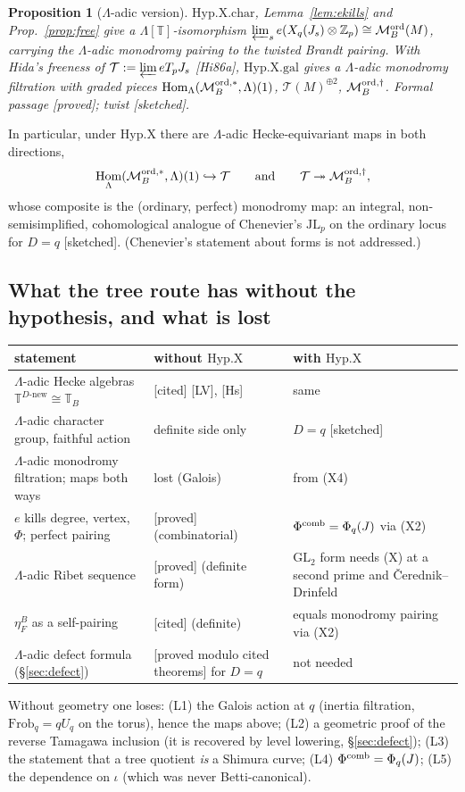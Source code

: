 \documentclass[11pt]{amsart}
\theoremstyle{plain}
\newtheorem{proposition}[theorem]{Proposition}
\theoremstyle{definition}
\theoremstyle{remark}
\newcommand{\status}[1]{\textup{\textsf{[#1]}}}
\newcommand{\stproved}{\status{proved}}
\newcommand{\stpmc}{\status{proved modulo cited theorems}}
\newcommand{\stcited}{\status{cited}}
\newcommand{\stsketch}{\status{sketched}}
\newcommand{\GL}{\mathrm{GL}}\newcommand{\SL}{\mathrm{SL}}\newcommand{\PGL}{\mathrm{PGL}}
\newcommand{\JL}{\mathrm{JL}}\newcommand{\ord}{\mathrm{ord}}
\newcommand{\T}{\mathbb{T}}\newcommand{\m}{\mathfrak{m}}\newcommand{\cT}{\mathcal{T}}\newcommand{\cX}{\mathcal{X}}
\newcommand{\cM}{\mathcal{M}}\newcommand{\Frac}{\mathrm{Frac}}\newcommand{\tq}{\mathfrak{t}}\newcommand{\cc}{\mathfrak{c}}
\DeclareMathOperator{\Hom}{Hom}\DeclareMathOperator{\coker}{coker}\DeclareMathOperator{\End}{End}
\begin{document}
\begin{proposition}[$\Lambda$-adic version]\label{prop:Xlambda}
$\mathrm{Hyp.X.char}$, Lemma~\ref{lem:ekills} and Prop.~\ref{prop:free} give a $\Lambda[\T]$-isomorphism $\varprojlim_se(X_q(J_s)\otimes\Z_p)\cong\cM^{\rm ord}_B(M)$, carrying the $\Lambda$-adic monodromy pairing to the twisted Brandt pairing. With Hida's freeness of $\cT:=\varprojlim eT_pJ_s$ [Hi86a], $\mathrm{Hyp.X.gal}$ gives a $\Lambda$-adic monodromy filtration with graded pieces $\Hom_\Lambda(\cM^{\rm ord,*}_B,\Lambda)(1)$, $\cT(M)^{\oplus2}$, $\cM^{\rm ord,\dagger}_B$. Formal passage \stproved; twist \stsketch.
\end{proposition}
In particular, under $\mathrm{Hyp.X}$ there are $\Lambda$-adic Hecke-equivariant maps in both directions,
\[\Hom_\Lambda(\cM^{\rm ord,*}_B,\Lambda)(1)\hookrightarrow\cT\qquad\text{and}\qquad\cT\twoheadrightarrow\cM^{\rm ord,\dagger}_B,\]
whose composite is the (ordinary, perfect) monodromy map: an integral, non-semisimplified, cohomological analogue of Chenevier's $\JL_p$ on the ordinary locus for $D=q$ \stsketch. (Chenevier's statement about forms is not addressed.)

\subsection{What the tree route has without the hypothesis, and what is lost}
\begin{center}\small
\begin{longtable}{@{}p{5.6cm}p{4.2cm}p{4.6cm}@{}}
\toprule
statement & without $\mathrm{Hyp.X}$ & with $\mathrm{Hyp.X}$\\\midrule
$\Lambda$-adic Hecke algebras $\T^{D\text{-new}}\cong\T_B$ & \stcited{} [LV], [Hs] & same\\
$\Lambda$-adic character group, faithful action & definite side only & $D=q$ \stsketch\\
$\Lambda$-adic monodromy filtration; maps both ways & lost (Galois) & from (X4)\\
$e$ kills degree, vertex, $\Phi$; perfect pairing & \stproved{} (combinatorial) & $\Phi^{\rm comb}=\Phi_q(J)$ via (X2)\\
$\Lambda$-adic Ribet sequence & \stproved{} (definite form) & $\GL_2$ form needs (X) at a second prime and Čerednik--Drinfeld\\
$\eta^B_F$ as a self-pairing & \stcited{} (definite) & equals monodromy pairing via (X2)\\
$\Lambda$-adic defect formula (\S\ref{sec:defect}) & \stpmc{} for $D=q$ & not needed\\
\bottomrule
\end{longtable}
\end{center}
Without geometry one loses: (L1) the Galois action at $q$ (inertia filtration, $\mathrm{Frob}_q=qU_q$ on the torus), hence the maps above; (L2) a geometric proof of the reverse Tamagawa inclusion (it is recovered by level lowering, \S\ref{sec:defect}); (L3) the statement that a tree quotient \emph{is} a Shimura curve; (L4) $\Phi^{\rm comb}=\Phi_q(J)$; (L5) the dependence on $\iota$ (which was never Betti-canonical).
\end{document}
